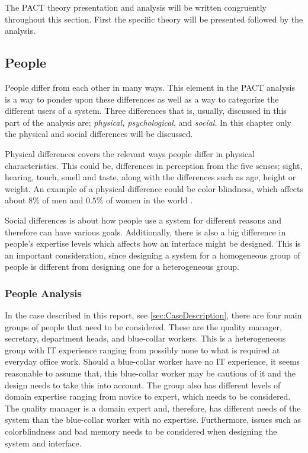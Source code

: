 The PACT theory presentation and analysis will be written congruently throughout this section.
First the specific theory will be presented followed by the analysis.

\subsection{People}\label{sec:PACT-people}
People differ from each other in many ways.
This element in the PACT analysis is a way to ponder upon these differences as well as a way to categorize the different users of a system.
Three differences that is, usually, discussed in this part of the analysis are; \textit{physical, psychological}, and \textit{social}.
In this chapter only the physical and social differences will be discussed.

Physical differences covers the relevant ways people differ in physical characteristics.
This could be, differences in perception from the five senses; sight, hearing, touch, smell and taste, along with the differences such as age, height or weight.
An example of a physical difference could be color blindness, which affects about $8\%$ of men and $0.5\%$ of women in the world \cite{ColourBlind}.

Social differences is about how people use a system for different reasons and therefore can have various goals.
Additionally, there is also a big difference in people's expertise levels which affects how an interface might be designed.
This is an important consideration, since designing a system for a homogeneous group of people is  different from designing one for a heterogeneous group. \cite{Benyon}

\subsubsection*{People Analysis}
In the case described in this report, see \cref{sec:CaseDescription}, there are four main groups of people that need to be considered.
These are the quality manager, secretary, department heads, and blue-collar workers.
This is a heterogeneous group with IT experience ranging from possibly none to what is required at everyday office work.
Should a blue-collar worker have no IT experience, it seems reasonable to assume that, this blue-collar worker may be cautious of it and the design needs to take this into account.
The group also has different levels of domain expertise ranging from novice to expert, which needs to be considered.
The quality manager is a domain expert and, therefore, has different needs of the system than the blue-collar worker with no expertise.
Furthermore, issues such as colorblindness and bad memory needs to be considered when designing the system and interface.

